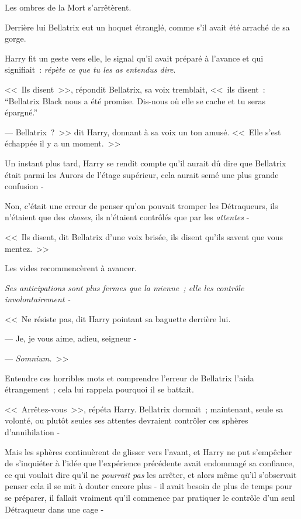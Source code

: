 Les ombres de la Mort s'arrêtèrent.

Derrière lui Bellatrix eut un hoquet étranglé, comme s'il avait été arraché de sa gorge.

Harry fit un geste vers elle, le signal qu'il avait préparé à l'avance et qui signifiait~: \emph{répète ce que tu les as entendus dire}.

<<~Ils disent~>>, répondit Bellatrix, sa voix tremblait, <<~ils disent~: “Bellatrix Black nous a été promise. Dis-nous où elle se cache et tu seras épargné.”

--- Bellatrix~?~>> dit Harry, donnant à sa voix un ton amusé. <<~Elle s'est échappée il y a un moment.~>>

Un instant plus tard, Harry se rendit compte qu'il aurait dû dire que Bellatrix était parmi les Aurors de l'étage supérieur, cela aurait semé une plus grande confusion -

Non, c'était une erreur de penser qu'on pouvait tromper les Détraqueurs, ils n'étaient que des \emph{choses}, ils n'étaient contrôlés que par les \emph{attentes} -

<<~Ils disent, dit Bellatrix d'une voix brisée, ils disent qu'ils savent que vous mentez.~>>

Les vides recommencèrent à avancer.

\emph{Ses anticipations sont plus fermes que la mienne~; elle les contrôle involontairement -}

<<~Ne résiste pas, dit Harry pointant sa baguette derrière lui.

--- Je, je vous aime, adieu, seigneur -

--- \emph{Somnium.}~>>

Entendre ces horribles mots et comprendre l'erreur de Bellatrix l'aida étrangement~; cela lui rappela pourquoi il se battait.

<<~Arrêtez-vous~>>, répéta Harry. Bellatrix dormait~; maintenant, seule sa volonté, ou plutôt seules ses attentes devraient contrôler ces sphères d'annihilation -

Mais les sphères continuèrent de glisser vers l'avant, et Harry ne put s'empêcher de s'inquiéter à l'idée que l'expérience précédente avait endommagé sa confiance, ce qui voulait dire qu'il ne \emph{pourrait pas} les arrêter, et alors même qu'il s'observait penser cela il se mit à douter encore plus - il avait besoin de plus de temps pour se préparer, il fallait vraiment qu'il commence par pratiquer le contrôle d'un seul Détraqueur dans une cage -

